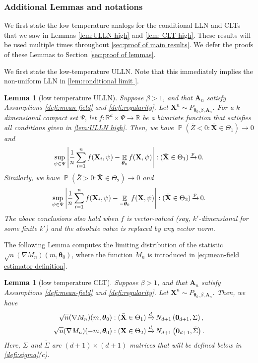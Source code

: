 \documentclass[preprint,reqno]{imsart}
\newtheorem{lemma}[thm]{Lemma}
\newcommand{\ttheta}{\boldsymbol{\theta}}
\DeclareMathOperator{\xp}{\xrightarrow{\mathnormal p}}
\DeclareMathOperator{\xd}{\xrightarrow{\mathnormal d}}
\DeclareMathOperator{\EE}{\mathbb{E}}
\DeclareMathOperator{\PP}{\mathbb{P}}
\newcommand{\A}{\mathbf{A}}
\newcommand{\X}{\mathbf{X}}
\DeclareMathOperator{\sumin}{\sum_{\mathnormal i=1}^{\mathnormal n}}
\begin{document}
\begin{appendix}
\subsubsection{Additional Lemmas and notations}\label{subsec:additional notation}
We first state the low temperature analogs for the conditional LLN and CLTs that we saw in Lemmas \ref{lem:ULLN high} and \ref{lem: CLT high}. These results will be used multiple times throughout \cref{sec:proof of main results}. We defer the proofs of these Lemmas to Section \ref{sec:proof of lemmas}. 

We first state the low-temperature ULLN. Note that this immediately implies the non-uniform LLN in \cref{lem:conditional limit }.


\begin{lemma}[low temperature ULLN]\label{lem:ULLN}
Suppose $\beta > 1$, and that $\A_n$ satisfy Assumptions \ref{defi:mean-field} and \ref{defi:regularity}. Let $\X^n \sim P_{\ttheta_0, \beta, \A_n}$.  For a $k$-dimensional compact set $\Psi$, let $f:\mathbb{R}^d \times \Psi \to \mathbb{R}$ be a bivariate function that satisfies all conditions given in \cref{lem:ULLN high}. Then, we have $\PP(\bar{Z} <0 : \bar{\X} \in \Theta_1) \to 0$ and 
    $$\sup_{\psi \in \Psi} \left| \frac{1}{n} \sumin f(\X_i, \psi) - \EE_{\ttheta_0} f(\X, \psi) \right| : (\bar{\X} \in \Theta_1) \xp 0.$$
    Similarly, we have $\PP(\bar{Z} >0 : \bar{\X} \in \Theta_2) \to 0$ and
    $$\sup_{\psi \in \Psi} \left| \frac{1}{n} \sumin f(\X_i, \psi) - \EE_{-\ttheta_0} f(\X, \psi) \right| : (\bar{\X} \in \Theta_2) \xp 0.$$
    The above conclusions also hold when $f$ is vector-valued (say, $k'$-dimensional for some finite $k'$) and the absolute value is replaced by any vector norm.
\end{lemma}

The following Lemma computes the limiting distribution of the statistic $\sqrt{n} (\nabla M_n) (m, \ttheta_0)$, where the function $M_n$ is introduced in \eqref{eq:mean-field estimator definition}. %

\begin{lemma}[low temperature CLT]\label{lem: CLT}
Suppose $\beta > 1$, and that $\A_n$ satisfy Assumptions \ref{defi:mean-field} and \ref{defi:regularity}. Let $\X^n \sim P_{\ttheta_0, \beta, \A_n}$.  Then, we have
\begin{align*}
    \sqrt{n} (\nabla M_n) (m, \ttheta_0) : (\bar{\X} \in \Theta_1) &\xd N_{d+1}\left(\mathbf{0}_{d+1}, \Sigma \right), \\
    \sqrt{n} (\nabla M_n) (-m, \ttheta_0) : (\bar{\X} \in \Theta_2) &\xd N_{d+1}\left(\mathbf{0}_{d+1}, \tilde{\Sigma} \right).
\end{align*}
Here, $\Sigma$ and $\tilde{\Sigma}$ are $(d+1) \times (d+1)$ matrices that will be defined below in \cref{defi:sigma}(c).
\end{lemma}


\end{appendix}
\end{document}
